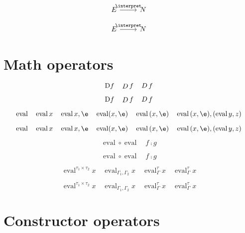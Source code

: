 \documentclass{article}
\DeclarePairedDelimiter\interpret\llbracket\rrbracket
\DeclareMathOperator{\eval}{eval}
\begin{document}
\begin{verbatim*}
\[\begin{tikzcd}E \rar{\interpret} & N\end{tikzcd}\]
\end{verbatim*}
%
\[\begin{tikzcd}E \rar{\interpret} & N\end{tikzcd}\]

\section{Math operators}

\begin{verbatim*}

\DeclareMathOperator{\eval}{eval}
\DeclareMathInfix{\comp}{;}
\end{verbatim*}

\begin{verbatim*}
\[
\mathfont{D} f\quad
\mathop{D} f\quad
\mymathop{D} f
\]
\end{verbatim*}
%
\[
  \mathfont{D} f \quad
  \mathop{D} f \quad
  \mymathop{D} f
\]

\begin{verbatim*}
\[
\eval\quad
\eval{x}\quad
\eval{x,\e}\quad
\eval(x,\e)\quad
\eval{(x,\e)}\quad
\eval{{(x,\e)},(\eval{y,z})}
\]
\end{verbatim*}
%
\[
  \eval           \quad
  \eval{x}        \quad
  \eval{x,\e}     \quad
  \eval(x,\e)     \quad
  \eval{(x,\e)} \quad
  \eval{{(x,\e)},(\eval{y,z})}
\]

\begin{verbatim*}
\[
\eval \circ \eval\quad
f \comp g
\]
\end{verbatim*}
%
\[
  \eval \circ \eval\quad
  f \comp g
\]

\begin{verbatim*}
\[
\eval^{\tau_1\times\tau_2}{x}\quad
\eval_{\Gamma_1,\Gamma_2}{x}\quad
\eval^\tau_\Gamma{x}\quad
\eval_\Gamma^\tau{x}
\]
\end{verbatim*}
%
\[
  \eval^{\tau_1 \times \tau_2}{x} \quad
  \eval_{\Gamma_1, \Gamma_2}{x}   \quad
  \eval^\tau_\Gamma{x}            \quad
  \eval_\Gamma^\tau{x}
\]

\section{Constructor operators}
\end{document}
